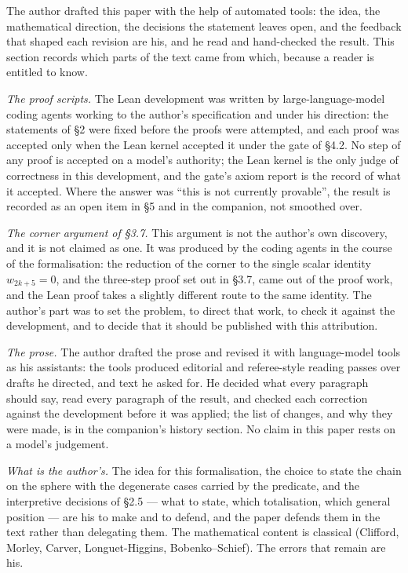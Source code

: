 \documentclass[11pt]{article}
\theoremstyle{definition}
\theoremstyle{remark}
\begin{document}
The author drafted this paper with the help of automated tools: the idea, the mathematical direction, the
decisions the statement leaves open, and the feedback that shaped each revision are his, and he read and
hand-checked the result. This section records which parts of the text came from which, because a reader
is entitled to know.

\emph{The proof scripts.} The Lean development was written by large-language-model coding agents working to the
author's specification and under his direction: the statements of \S{}2 were fixed before the proofs were
attempted, and each proof was accepted only when the Lean kernel accepted it under the gate of \S{}4.2. No
step of any proof is accepted on a model's authority; the Lean kernel is the only judge of correctness in
this development, and the gate's axiom report is the record of what it accepted. Where the answer was
``this is not currently provable'', the result is recorded as an open item in \S{}5 and in the companion, not
smoothed over.

\emph{The corner argument of \S{}3.7.} This argument is not the author's own discovery, and it is not claimed as
one. It was produced by the coding agents in the course of the formalisation: the reduction of the corner
to the single scalar identity \(w_{2k+5} = 0\), and the three-step proof set out in \S{}3.7, came out of the
proof work, and the Lean proof takes a slightly different route to the same identity. The author's part
was to set the problem, to direct that work, to check it against the development, and to decide that it
should be published with this attribution.

\emph{The prose.} The author drafted the prose and revised it with language-model tools as his assistants: the
tools produced editorial and referee-style reading passes over drafts he directed, and text he asked for.
He decided what every paragraph should say, read every paragraph of the result, and checked each
correction against the development before it was applied; the list of changes, and why they were made, is
in the companion's history section. No claim in this paper rests on a model's judgement.

\emph{What is the author's.} The idea for this formalisation, the choice to state the chain on the sphere with
the degenerate cases carried by the predicate, and the interpretive decisions of \S{}2.5 --- what to state,
which totalisation, which general position --- are his to make and to defend, and the paper defends them in
the text rather than delegating them. The mathematical content is classical (Clifford, Morley, Carver,
Longuet-Higgins, Bobenko--Schief). The errors that remain are his.
\end{document}
